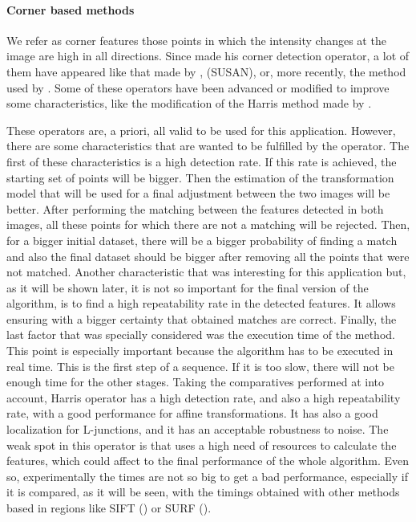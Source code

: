 \paragraph{Corner based methods}\label{ch:chapter02_01_02_01_01}

We refer as corner features those points in which the intensity changes at the image are high in all directions. Since \cite{hans1977towards} made his corner detection operator, a lot of them have appeared like that made by \cite{harris1988combined}, \cite{smith1997susan} (SUSAN), or, more recently, the method used by \cite{rosten2006machine}. Some of these operators have been advanced or modified to improve some characteristics, like the modification of the Harris method made by \cite{shi1994good}.

These operators are, a priori, all valid to be used for this application. However, there are some characteristics that are wanted to be fulfilled by the operator. The first of these characteristics is a high detection rate. If this rate is achieved, the starting set of points will be bigger. Then the estimation of the transformation model that will be used for a final adjustment between the two images will be better. After performing the matching between the features detected in both images, all these points for which there are not a matching will be rejected. Then, for a bigger initial dataset, there will be a bigger probability of finding a match and also the final dataset should be bigger after removing all the points that were not matched. Another characteristic that was interesting for this application but, as it will be shown later, it is not so important for the final version of the algorithm, is to find a high repeatability rate in the detected features. It allows ensuring with a bigger certainty that obtained matches are correct. Finally, the last factor that was specially considered was the execution time of the method. This point is especially important because the algorithm has to be executed in real time. This is the first step of a sequence. If it is too slow, there will not be enough time for the other stages. Taking the comparatives performed at \cite{mohanna2001performance, zheng1999analysis} into account, Harris operator has a high detection rate, and also a high repeatability rate, with a good performance for affine transformations. It has also a good localization for L-junctions, and it has an acceptable robustness to noise. The weak spot in this operator is that uses a high need of resources to calculate the features, which could affect to the final performance of the whole algorithm. Even so, experimentally the times are not so big to get a bad performance, especially if it is compared, as it will be seen, with the timings obtained with other methods based in regions like SIFT (\cite{lowe1999object}) or SURF (\cite{bay2008speeded}).


